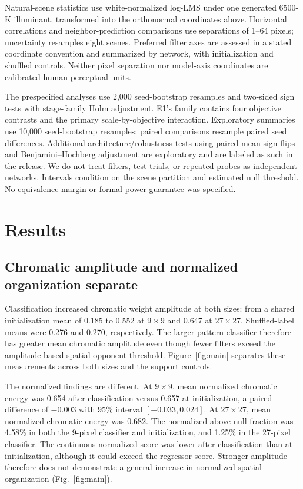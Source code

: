 \documentclass[authoryear,preprint,review,12pt]{elsarticle}
\begin{document}
Natural-scene statistics use white-normalized log-LMS under one generated 6500-K illuminant, transformed into the orthonormal coordinates above. Horizontal correlations and neighbor-prediction comparisons use separations of 1--64 pixels; uncertainty resamples eight scenes. Preferred filter axes are assessed in a stated coordinate convention and summarized by network, with initialization and shuffled controls. Neither pixel separation nor model-axis coordinates are calibrated human perceptual units.

The prespecified analyses use 2,000 seed-bootstrap resamples and two-sided sign tests with stage-family Holm adjustment. E1's family contains four objective contrasts and the primary scale-by-objective interaction. Exploratory summaries use 10,000 seed-bootstrap resamples; paired comparisons resample paired seed differences. Additional architecture/robustness tests using paired mean sign flips and Benjamini--Hochberg adjustment are exploratory and are labeled as such in the release. We do not treat filters, test trials, or repeated probes as independent networks. Intervals condition on the scene partition and estimated null threshold. No equivalence margin or formal power guarantee was specified.

\section{Results}\label{sec:results}

\subsection{Chromatic amplitude and normalized organization separate}
Classification increased chromatic weight amplitude at both sizes: from a shared initialization mean of 0.185 to 0.552 at $9\times9$ and 0.647 at $27\times27$. Shuffled-label means were 0.276 and 0.270, respectively. The larger-pattern classifier therefore has greater mean chromatic amplitude even though fewer filters exceed the amplitude-based spatial opponent threshold. Figure~\ref{fig:main} separates these measurements across both sizes and the support controls.

The normalized findings are different. At $9\times9$, mean normalized chromatic energy was 0.654 after classification versus 0.657 at initialization, a paired difference of $-0.003$ with 95\% interval $[-0.033,0.024]$. At $27\times27$, mean normalized chromatic energy was 0.682. The normalized above-null fraction was 4.58\% in both the 9-pixel classifier and initialization, and 1.25\% in the 27-pixel classifier. The continuous normalized score was lower after classification than at initialization, although it could exceed the regressor score. Stronger amplitude therefore does not demonstrate a general increase in normalized spatial organization (Fig.~\ref{fig:main}).
\end{document}
